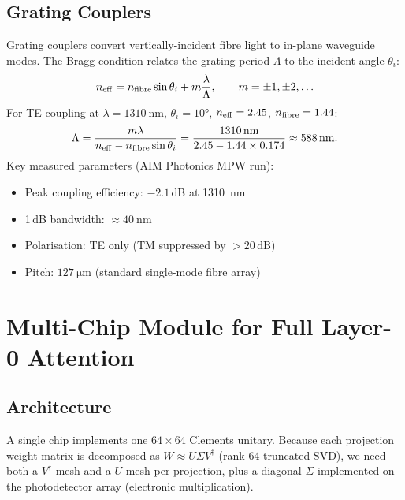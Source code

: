 \documentclass[12pt, a4paper]{article}
\begin{document}
\subsection{Grating Couplers}

Grating couplers convert vertically-incident fibre light to in-plane
waveguide modes.
The Bragg condition relates the grating period $\Lambda$ to the incident angle
$\theta_i$:
\begin{equation}
  n_{\rm eff} = n_{\rm fibre}\sin\theta_i + m\frac{\lambda}{\Lambda},
  \qquad m = \pm 1,\pm 2,\ldots
  \label{eq:bragg}
\end{equation}
For TE coupling at $\lambda = \SI{1310}{\nano\metre}$, $\theta_i = 10°$,
$n_{\rm eff} = 2.45$, $n_{\rm fibre} = 1.44$:
\begin{equation}
  \Lambda = \frac{m\lambda}{n_{\rm eff} - n_{\rm fibre}\sin\theta_i}
  = \frac{1310\,\mathrm{nm}}{2.45 - 1.44\times0.174}
  \approx 588\,\mathrm{nm}.
\end{equation}
Key measured parameters (AIM Photonics MPW run):
\begin{itemize}
  \item Peak coupling efficiency: $-2.1$\,dB at \SI{1310}{\nano\metre}
  \item 1\,dB bandwidth: $\approx \SI{40}{\nano\metre}$
  \item Polarisation: TE only (TM suppressed by $>20$\,dB)
  \item Pitch: $\SI{127}{\micro\metre}$ (standard single-mode fibre array)
\end{itemize}

\section{Multi-Chip Module for Full Layer-0 Attention}
\label{sec:mcm}

\subsection{Architecture}

A single chip implements one $64\times64$ Clements unitary.
Because each projection weight matrix is decomposed as $W \approx U\Sigma V^\dagger$
(rank-64 truncated SVD), we need both a $V^\dagger$ mesh and a $U$ mesh per
projection, plus a diagonal $\Sigma$ implemented on the photodetector array
(electronic multiplication).
\end{document}
